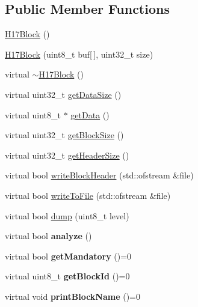 \subsection*{Public Member Functions}
\begin{DoxyCompactItemize}
\item 
\hyperlink{classH17Block_a5d06cd148e7f1c99d7bfdb559ebba7f5}{H17\+Block} ()
\item 
\hyperlink{classH17Block_a746b085ff10b005cfd428a26d123e636}{H17\+Block} (uint8\+\_\+t buf\mbox{[}$\,$\mbox{]}, uint32\+\_\+t size)
\item 
virtual \hyperlink{classH17Block_acb2daf712d9b2c2f6640146728189720}{$\sim$\+H17\+Block} ()
\item 
virtual uint32\+\_\+t \hyperlink{classH17Block_aa2e87b141623b4c897c5337ea0535d1c}{get\+Data\+Size} ()
\item 
virtual uint8\+\_\+t $\ast$ \hyperlink{classH17Block_a6c2432cccdacdfb1a335bd924f19d942}{get\+Data} ()
\item 
virtual uint32\+\_\+t \hyperlink{classH17Block_a0327b6359cdf502269bbb7c6f35fae18}{get\+Block\+Size} ()
\item 
virtual uint32\+\_\+t \hyperlink{classH17Block_ad71ae203afc8713d4ee7416757fadbbe}{get\+Header\+Size} ()
\item 
virtual bool \hyperlink{classH17Block_a5c4d56a6c991c87fb9215797ce63b804}{write\+Block\+Header} (std\+::ofstream \&file)
\item 
virtual bool \hyperlink{classH17Block_a59901675cd140c907fb6de4c8e0452d5}{write\+To\+File} (std\+::ofstream \&file)
\item 
virtual bool \hyperlink{classH17Block_ac17cf2a0e1699277192063e13bee30b1}{dump} (uint8\+\_\+t level)
\item 
\hypertarget{classH17Block_ae53600d945ed3ffac13d3a769a1e1ab2}{}virtual bool {\bfseries analyze} ()\label{classH17Block_ae53600d945ed3ffac13d3a769a1e1ab2}

\item 
\hypertarget{classH17Block_aaa0781459cf3d6001a11878b3a56ede2}{}virtual bool {\bfseries get\+Mandatory} ()=0\label{classH17Block_aaa0781459cf3d6001a11878b3a56ede2}

\item 
\hypertarget{classH17Block_ad246371454be174971db35a8f8e06ef7}{}virtual uint8\+\_\+t {\bfseries get\+Block\+Id} ()=0\label{classH17Block_ad246371454be174971db35a8f8e06ef7}

\item 
\hypertarget{classH17Block_a90cc5627a748c3f0e5f39a2e5ede671f}{}virtual void {\bfseries print\+Block\+Name} ()=0\label{classH17Block_a90cc5627a748c3f0e5f39a2e5ede671f}

\end{DoxyCompactItemize}
